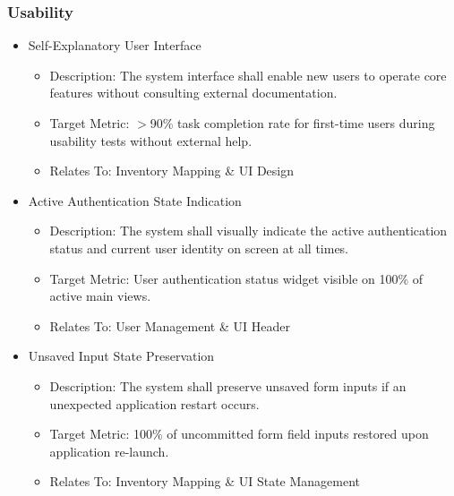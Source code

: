 \documentclass[conference]{IEEEtran}
\begin{document}
\subsubsection{Usability}
\begin{itemize}
    \item Self-Explanatory User Interface
    \begin{itemize}
        \item Description: The system interface shall enable new users to operate core features without consulting external documentation.
        \item Target Metric: $>$90\% task completion rate for first-time users during usability tests without external help.
        \item Relates To: Inventory Mapping \& UI Design
    \end{itemize}

    \item Active Authentication State Indication
    \begin{itemize}
        \item Description: The system shall visually indicate the active authentication status and current user identity on screen at all times.
        \item Target Metric: User authentication status widget visible on 100\% of active main views.
        \item Relates To: User Management \& UI Header
    \end{itemize}

    \item Unsaved Input State Preservation
    \begin{itemize}
        \item Description: The system shall preserve unsaved form inputs if an unexpected application restart occurs.
        \item Target Metric: 100\% of uncommitted form field inputs restored upon application re-launch.
        \item Relates To: Inventory Mapping \& UI State Management
    \end{itemize}
\end{itemize}
\end{document}

